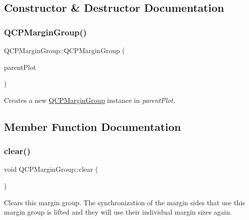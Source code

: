 \subsection{Constructor \& Destructor Documentation}
\mbox{\label{class_q_c_p_margin_group_ac481c20678ec5b305d6df330715f4b7b}} 
\subsubsection{\texorpdfstring{Q\+C\+P\+Margin\+Group()}{QCPMarginGroup()}}
{\footnotesize\ttfamily Q\+C\+P\+Margin\+Group\+::\+Q\+C\+P\+Margin\+Group (\begin{DoxyParamCaption}\item[{\mbox{\hyperlink{class_q_custom_plot}{Q\+Custom\+Plot}} $\ast$}]{parent\+Plot }\end{DoxyParamCaption})}

Creates a new \mbox{\hyperlink{class_q_c_p_margin_group}{Q\+C\+P\+Margin\+Group}} instance in {\itshape parent\+Plot}. 

\subsection{Member Function Documentation}
\mbox{\label{class_q_c_p_margin_group_a144b67f216e4e86c3a3a309e850285fe}} 
\subsubsection{\texorpdfstring{clear()}{clear()}}
{\footnotesize\ttfamily void Q\+C\+P\+Margin\+Group\+::clear (\begin{DoxyParamCaption}{ }\end{DoxyParamCaption})}

Clears this margin group. The synchronization of the margin sides that use this margin group is lifted and they will use their individual margin sizes again. \mbox{\label{class_q_c_p_margin_group_ac967a4dc5fe02ae44aeb43511d5e1bd4}} 
